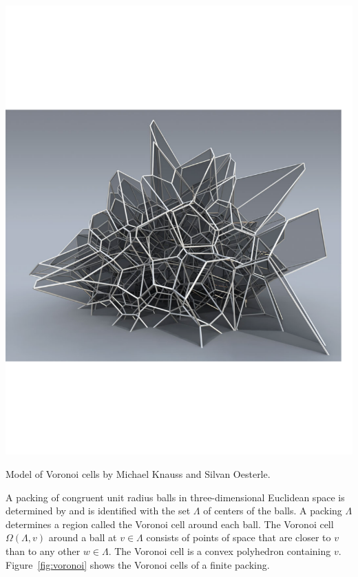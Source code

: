\documentclass{article} %
\begin{document}
\begin{Figure}[htb]
  \begin{center}
    \includegraphics[scale=0.25]{images/voronoi_knauss_oesterle_cropped.pdf}
  \end{center}
  \caption{Model of Voronoi cells by Michael Knauss and Silvan Oesterle.}
  \label{fig:voronoi}
 \end{Figure}

A packing of congruent unit radius balls in three-dimensional
Euclidean space is determined by and is identified with the set
$\Lambda$ of centers of the balls.
A packing  $\Lambda$ determines a region called the Voronoi cell around
each ball.  The Voronoi cell
$\Omega(\Lambda,v)$ around a ball at $v\in \Lambda$ consists of points
of space that are closer to $v$ than to any other $w\in\Lambda$. The
Voronoi cell is a convex polyhedron containing $v$.  Figure~\ref{fig:voronoi} shows
the Voronoi cells of a finite packing.
\end{document}
